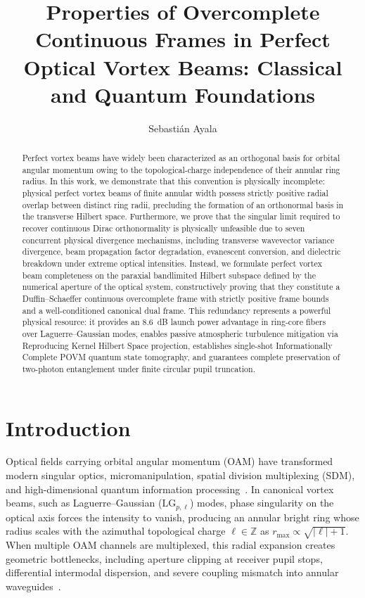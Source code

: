 \documentclass{optica-article}
\begin{document}
\title{Properties of Overcomplete Continuous Frames in Perfect Optical Vortex Beams: Classical and Quantum Foundations}

\author{Sebastián Ayala}

\address{Investigador Independiente / Independent Researcher, Cauquenes, Regi{\'o}n del Maule, Chile}


\begin{abstract}
Perfect vortex beams have widely been characterized as an orthogonal basis for orbital angular momentum owing to the topological-charge independence of their annular ring radius. In this work, we demonstrate that this convention is physically incomplete: physical perfect vortex beams of finite annular width possess strictly positive radial overlap between distinct ring radii, precluding the formation of an orthonormal basis in the transverse Hilbert space. Furthermore, we prove that the singular limit required to recover continuous Dirac orthonormality is physically unfeasible due to seven concurrent physical divergence mechanisms, including transverse wavevector variance divergence, beam propagation factor degradation, evanescent conversion, and dielectric breakdown under extreme optical intensities. Instead, we formulate perfect vortex beam completeness on the paraxial bandlimited Hilbert subspace defined by the numerical aperture of the optical system, constructively proving that they constitute a Duffin--Schaeffer continuous overcomplete frame with strictly positive frame bounds and a well-conditioned canonical dual frame. This redundancy represents a powerful physical resource: it provides an 8.6~dB launch power advantage in ring-core fibers over Laguerre--Gaussian modes, enables passive atmospheric turbulence mitigation via Reproducing Kernel Hilbert Space projection, establishes single-shot Informationally Complete POVM quantum state tomography, and guarantees complete preservation of two-photon entanglement under finite circular pupil truncation.
\end{abstract}

\section{Introduction}
\label{sec:intro}

Optical fields carrying orbital angular momentum (OAM) have transformed modern singular optics, micromanipulation, spatial division multiplexing (SDM), and high-dimensional quantum information processing~\cite{Allen1992,Gbur2016,Mair2001}. In canonical vortex beams, such as Laguerre--Gaussian ($\text{LG}_{p, \ell}$) modes, phase singularity on the optical axis forces the intensity to vanish, producing an annular bright ring whose radius scales with the azimuthal topological charge $\ell \in \mathbb{Z}$ as $r_{\max} \propto \sqrt{|\ell| + 1}$. When multiple OAM channels are multiplexed, this radial expansion creates geometric bottlenecks, including aperture clipping at receiver pupil stops, differential intermodal dispersion, and severe coupling mismatch into annular waveguides~\cite{Villalba2023}.
\end{document}
